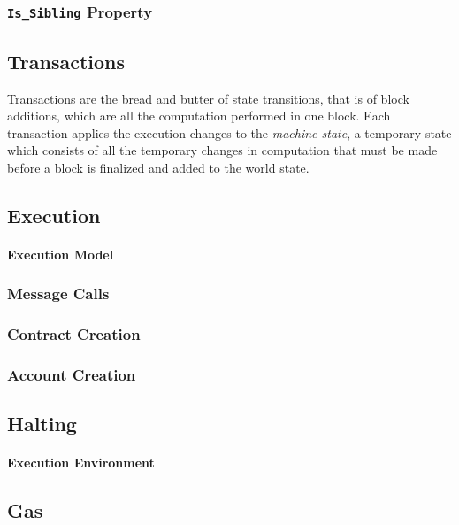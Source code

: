 \documentclass[10pt,a4paper,leqno,bibliography=totoc]{scrartcl}
\newenvironment{alphafootnotes}
{\par\edef\savedfootnotenumber{\number\value{footnote}}
\renewcommand{\thefootnote}{\alph{footnote}}
\setcounter{footnote}{0}}
{\par\setcounter{footnote}{\savedfootnotenumber}}
\begin{document}
\begin{alphafootnotes}
\begin{multicols*}{2}
			\subsubsection{\texttt{Is\_Sibling} Property}

		\subsection{Transactions}
			Transactions are the bread and butter of state transitions, that is of block additions, which are all the computation performed in one block. Each transaction applies the execution changes to the \textit{machine state}, a temporary state which consists of all the temporary changes in computation that must be made before a block is finalized and added to the world state.

		\subsection{Execution}

	
				\paragraph{Execution Model}
	
			\subsubsection{Message Calls}

			\subsubsection{Contract Creation}
		
			\subsubsection{Account Creation}
			
			\subsection{Halting}
				\paragraph{Execution Environment}
	
			\subsection{Gas}
	

\end{multicols*}
\end{alphafootnotes}
\end{document}
